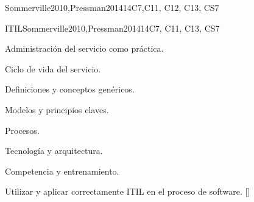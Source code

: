 \begin{syllabus}
\begin{unit}{\SESoftwareProjectManagement}{}{Sommerville2010,Pressman2014}{14}{C7,C11, C12, C13, CS7}
\begin{learningoutcomes}
    \item \SESoftwareProjectManagementLOTrack [\Usage]
    \item \SESoftwareProjectManagementLOCompareSimple [\Usage]
    \item \SESoftwareProjectManagementLOUseATool [\Usage]
    \item \SESoftwareProjectManagementLODescribeTheRiskThe [\Usage]
    \item \SESoftwareProjectManagementLOIdentifyRisks [\Usage]
    \item \SESoftwareProjectManagementLOExplainHowDecisions [\Usage]
    \item \SESoftwareProjectManagementLOIdentifySecurity [\Usage]
    \item \SESoftwareProjectManagementLODemonstrateA [\Usage]
    \item \SESoftwareProjectManagementLOApplyTheOf [\Usage]
    \item \SESoftwareProjectManagementLOConductAAnalysis [\Usage]
    \item \SESoftwareProjectManagementLOIdentifyAndOfFor [\Usage]
\end{learningoutcomes}
\end{unit}

\begin{unit}{}{ITIL}{Sommerville2010,Pressman2014}{14}{C7, C11, C13, CS7}
\begin{topics}
    \item Administración del servicio como práctica.
    \item Ciclo de vida del servicio.
    \item Definiciones y conceptos genéricos.
    \item Modelos y principios claves.
    \item Procesos.
    \item Tecnología y arquitectura.
    \item Competencia y entrenamiento.
\end{topics}
\begin{learningoutcomes}
  \item Utilizar y aplicar correctamente ITIL en el proceso de software. [\Usage]
\end{learningoutcomes}
\end{unit}


\end{syllabus}
